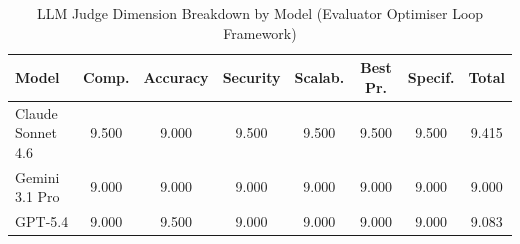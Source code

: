 \begin{table}[htbp]
\centering
\caption{LLM Judge Dimension Breakdown by Model (Evaluator Optimiser Loop Framework)}
\label{tab:judge_breakdown}
\begin{tabular}{lccccccc}
\toprule
Model & Comp. & Accuracy & Security & Scalab. & Best Pr. & Specif. & Total \\
\midrule
Claude Sonnet 4.6 & 9.500 & 9.000 & 9.500 & 9.500 & 9.500 & 9.500 & 9.415 \\
Gemini 3.1 Pro & 9.000 & 9.000 & 9.000 & 9.000 & 9.000 & 9.000 & 9.000 \\
GPT-5.4 & 9.000 & 9.500 & 9.000 & 9.000 & 9.000 & 9.000 & 9.083 \\
\bottomrule
\end{tabular}
\end{table}